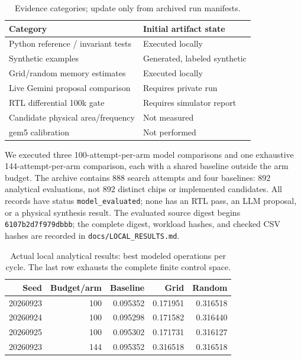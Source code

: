 \documentclass[conference]{IEEEtran}
\begin{document}
\begin{table}[t]
\centering
\caption{Evidence categories; update only from archived run manifests.}
\begin{tabular}{ll}
\toprule
Category & Initial artifact state\\
\midrule
Python reference / invariant tests & Executed locally\\
Synthetic examples & Generated, labeled synthetic\\
Grid/random memory estimates & Executed locally\\
Live Gemini proposal comparison & Requires private run\\
RTL differential 100k gate & Requires simulator report\\
Candidate physical area/frequency & Not measured\\
gem5 calibration & Not performed\\
\bottomrule
\end{tabular}
\end{table}

We executed three 100-attempt-per-arm model comparisons and one exhaustive
144-attempt-per-arm comparison, each with a shared baseline outside the arm
budget. The archive contains 888 search attempts and four baselines: 892
analytical evaluations, not 892 distinct chips or implemented candidates.
All records have status \texttt{model\_evaluated}; none has an RTL pass, an LLM
proposal, or a physical synthesis result. The evaluated source digest begins
\texttt{6107b2d7f979dbbb}; the complete digest, workload hashes, and checked CSV
hashes are recorded in \texttt{docs/LOCAL\_RESULTS.md}.

\begin{table}[t]
\centering
\caption{Actual local analytical results: best modeled operations per cycle.
The last row exhausts the complete finite control space.}
\begin{tabular}{rrrrr}
\toprule
Seed & Budget/arm & Baseline & Grid & Random\\
\midrule
20260923 & 100 & 0.095352 & 0.171951 & 0.316518\\
20260924 & 100 & 0.095298 & 0.171582 & 0.316440\\
20260925 & 100 & 0.095302 & 0.171731 & 0.316127\\
20260923 & 144 & 0.095352 & 0.316518 & 0.316518\\
\bottomrule
\end{tabular}
\end{table}
\end{document}

